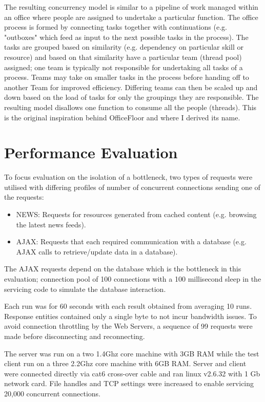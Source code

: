 \documentclass[conference]{ieee/IEEEtran}
\begin{document}
The resulting concurrency model is similar to a pipeline of work managed within
an office where people are assigned to undertake a particular function.
The office process is formed by connecting tasks together with continuations
(e.g. "outboxes" which feed as input to the next possible tasks in the process).
 The tasks are grouped based on similarity (e.g. dependency on particular skill
or resource) and based on that similarity have a particular team (thread pool)
assigned; one team is typically not responsible for undertaking all tasks of a
process.  Teams may take on smaller tasks in the process before handing off to
another Team for improved efficiency.  Differing teams can then be scaled up and
down based on the load of tasks for only the groupings they are responsible.
The resulting model disallows one function to consume all the people (threads).
This is the original inspiration behind OfficeFloor and where I derived its
name.



\section{Performance Evaluation}
To focus evaluation on the isolation of a bottleneck, two types of requests were
utilised with differing profiles of number of concurrent connections sending one
of the requests:
\begin{itemize}
\item NEWS: Requests for resources generated from cached content (e.g. browsing
the latest news feeds).
\item AJAX: Requests that each required communication with a database (e.g.
AJAX calls to retrieve/update data in a database).
\end{itemize}

The AJAX requests depend on the database which is the bottleneck in this
evaluation; connection pool of 100 connections with a 100 millisecond sleep in
the servicing code to simulate the database interaction.

Each run was for 60 seconds with each result obtained from averaging 10 runs.
Response entities contained only a single byte to not incur bandwidth issues.
To avoid connection throttling by the Web Servers, a sequence of 99 requests
were made before disconnecting and reconnecting.

The server was run on a two 1.4Ghz core machine with 3GB RAM while the test
client run on a three 2.2Ghz core machine with 6GB RAM.  Server and client were
connected directly via cat6 cross-over cable and ran linux v2.6.32 with 1 Gb
network card.  File handles and TCP settings were increased to enable servicing
20,000 concurrent connections.
\end{document}
